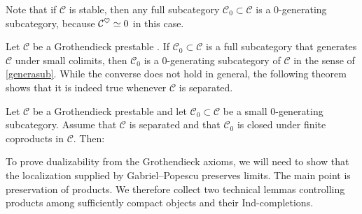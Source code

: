 \documentclass[a4paper,10pt, oneside]{amsart}
\begin{document}
	\begin{rem}
		Note that if $\mathcal{C}$ is stable, then any full subcategory $\mathcal{C}_0 \subset \mathcal{C}$ is a $0$-generating subcategory, because $\mathcal{C}^\heartsuit\simeq0$ in this case.
	\end{rem}
	\begin{rem}
	Let $\mathcal{C}$ be a Grothendieck prestable \infcat. If $\mathcal{C}_0 \subset \mathcal{C}$ is a full subcategory that generates $\mathcal{C}$ under small colimits, then $\mathcal{C}_0$ is a $0$-generating subcategory of $\mathcal{C}$ in the sense of \cref{generasub}. While the converse does not hold in general, the following theorem shows that it is indeed true whenever $\mathcal{C}$ is separated.
	\end{rem}
	
	\begin{thm}\label{gplthm}
		Let $\mathcal{C}$ be a Grothendieck prestable \infcat and let $\mathcal{C}_0 \subset \mathcal{C}$ be a small $0$-generating subcategory. Assume that $\mathcal{C}$ is separated and that $\mathcal{C}_0$ is closed under finite coproducts in $\mathcal{C}$. Then:
	\end{thm}
	To prove dualizability from the Grothendieck axioms, we will need to show that the localization supplied by Gabriel--Popescu preserves limits. The main point is preservation of products. We therefore collect two technical lemmas controlling products among sufficiently compact objects and their Ind-completions.
	
\end{document}
